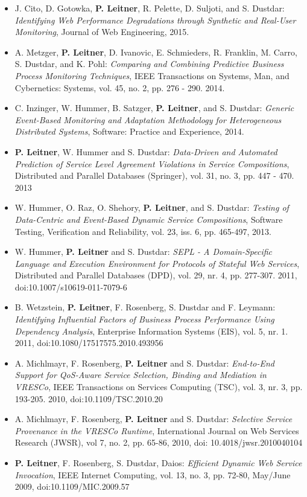 \documentclass[paper=letter,fontsize=11pt]{scrartcl} %
\begin{document}
\begin{itemize}
  \item J. Cito, D. Gotowka, \textbf{P. Leitner}, R. Pelette, D. Suljoti, and S. Dustdar: \emph{Identifying Web Performance Degradations through Synthetic and Real-User Monitoring}, Journal of Web Engineering, 2015.
  \item  A. Metzger, \textbf{P. Leitner}, D. Ivanovic, E. Schmieders, R. Franklin, M. Carro, S. Dustdar, and K. Pohl: \emph{Comparing and Combining Predictive Business Process Monitoring Techniques}, IEEE Transactions on Systems, Man, and Cybernetics: Systems, vol. 45, no. 2, pp. 276 - 290. 2014.
  \item C. Inzinger, W. Hummer, B. Satzger, \textbf{P. Leitner}, and S. Dustdar: \emph{Generic Event-Based Monitoring and Adaptation Methodology for Heterogeneous Distributed Systems}, Software: Practice and Experience, 2014.
  \item \textbf{P. Leitner}, W. Hummer and S. Dustdar: \emph{Data-Driven and Automated Prediction of Service Level Agreement Violations in Service Compositions}, Distributed and Parallel Databases (Springer), vol. 31, no. 3, pp. 447 - 470. 2013
  \item W. Hummer, O. Raz, O. Shehory, \textbf{P. Leitner}, and S. Dustdar: \emph{Testing of Data-Centric and Event-Based Dynamic Service Compositions}, Software Testing, Verification and Reliability, vol. 23, iss. 6, pp. 465-497, 2013.
\item W. Hummer, \textbf{P. Leitner} and S. Dustdar: \emph{SEPL - A
Domain-Specific Language and Execution Environment for Protocols of Stateful Web
Services}, Distributed and Parallel Databases (DPD), vol. 29, nr. 4, pp.
277-307. 2011, doi:10.1007/s10619-011-7079-6
\item B. Wetzstein, \textbf{P. Leitner}, F. Rosenberg, S. Dustdar and F. Leymann: \emph{Identifying Influential Factors of Business Process Performance Using Dependency Analysis}, Enterprise Information Systems (EIS), vol. 5, nr. 1. 2011, doi:10.1080/17517575.2010.493956
\item A. Michlmayr, F. Rosenberg, \textbf{P. Leitner} and S. Dustdar: \emph{End-to-End Support for QoS-Aware Service Selection, Binding and Mediation in VRESCo}, IEEE Transactions on Services Computing (TSC), vol. 3, nr. 3, pp. 193-205. 2010, doi:10.1109/TSC.2010.20
\item A. Michlmayr, F. Rosenberg, \textbf{P. Leitner} and S. Dustdar: \emph{Selective Service Provenance in the VRESCo Runtime}, International Journal on Web Services Research (JWSR), vol 7, no. 2, pp. 65-86, 2010, doi: 10.4018/jwsr.2010040104
\item \textbf{P. Leitner}, F. Rosenberg, S. Dustdar, Daios: \emph{Efficient Dynamic Web Service Invocation}, IEEE Internet Computing, vol. 13, no. 3, pp. 72-80, May/June 2009, doi:10.1109/MIC.2009.57
\end{itemize}
\end{document}
